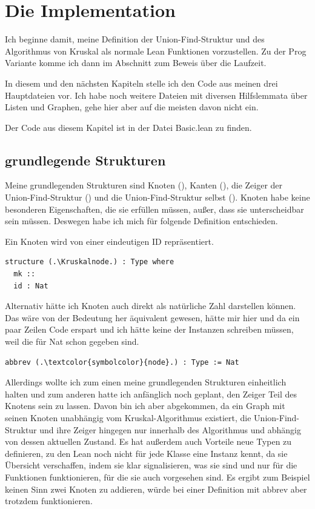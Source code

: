 \section{Die Implementation}\label{Implementation}
Ich beginne damit, meine Definition der Union-Find-Struktur und des Algorithmus von Kruskal als normale Lean Funktionen vorzustellen.
Zu der Prog Variante komme ich dann im Abschnitt zum Beweis über die Laufzeit.

In diesem und den nächsten Kapiteln stelle ich den Code aus meinen drei Hauptdateien vor.
Ich habe noch weitere Dateien mit diversen Hilfslemmata über Listen und Graphen, gehe hier aber auf die meisten davon nicht ein.

Der Code aus diesem Kapitel ist in der Datei Basic.lean zu finden.

\subsection{grundlegende Strukturen}
Meine grundlegenden Strukturen sind Knoten (\Kruskalnode), Kanten (\Kruskaledge), die Zeiger der Union-Find-Struktur (\KruskalunionFindLink) und die Union-Find-Struktur selbst (\KruskalunionFind).
Knoten habe keine besonderen Eigenschaften, die sie erfüllen müssen, außer, dass sie unterscheidbar sein müssen.
Deswegen habe ich mich für folgende Definition entschieden.

\begin{definition}[\Kruskalnode]
  Ein Knoten wird von einer eindeutigen ID repräsentiert.
\end{definition}
\begin{lstlisting}
structure (.\Kruskalnode.) : Type where
  mk ::
  id : Nat
\end{lstlisting}

Alternativ hätte ich Knoten auch direkt als natürliche Zahl darstellen können.
Das wäre von der Bedeutung her äquivalent gewesen, hätte mir hier und da ein paar Zeilen Code erspart und ich hätte keine der Instanzen schreiben müssen, weil die für Nat schon gegeben sind.

\begin{lstlisting}
abbrev (.\textcolor{symbolcolor}{node}.) : Type := Nat
\end{lstlisting}

Allerdings wollte ich zum einen meine grundlegenden Strukturen einheitlich halten und zum anderen hatte ich anfänglich noch geplant, den Zeiger Teil des Knotens sein zu lassen.
Davon bin ich aber abgekommen, da ein Graph mit seinen Knoten unabhängig vom Kruskal-Algorithmus existiert,
die Union-Find-Struktur und ihre Zeiger hingegen nur innerhalb des Algorithmus und abhängig von dessen aktuellen Zustand.
Es hat außerdem auch Vorteile neue Typen zu definieren, zu den Lean noch nicht für jede Klasse eine Instanz kennt, da sie Übersicht verschaffen, indem sie klar signalisieren, was sie sind
und nur für die Funktionen funktionieren, für die sie auch vorgesehen sind.
Es ergibt zum Beispiel keinen Sinn zwei Knoten zu addieren, würde bei einer Definition mit abbrev aber trotzdem funktionieren.

